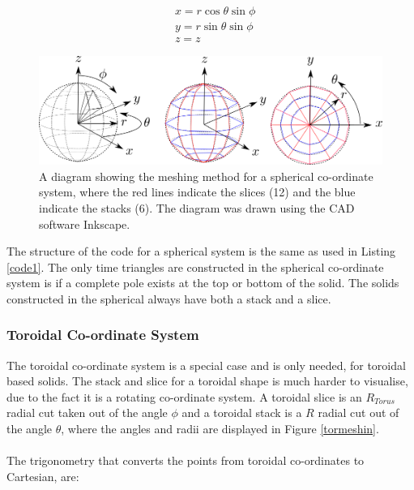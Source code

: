 \documentclass[12pt,a4paper]{article}
\begin{document}
\begin{equation}
\begin{aligned}
& x = r \cos{\theta}\sin{\phi}\\
& y = r \sin{\theta}\sin{\phi} \\
& z = z
\end{aligned}
\label{trigsph}
\end{equation}
\begin{figure}[h!]
\centering
\includegraphics[scale=0.5]{Images//Coords//sph.png}
\caption[width=\columnwidth]{A diagram showing the meshing method for a spherical co-ordinate system, where the red lines indicate the slices (12) and the blue indicate the stacks (6). The diagram was drawn using the CAD software Inkscape.}
\label{sphmeshin}
\end{figure}

\noindent The structure of the code for a spherical system is the same as used in Listing \ref{code1}. The only time triangles are constructed in the spherical co-ordinate system is if a complete pole exists at the top or bottom of the solid. The solids constructed in the spherical always have both a stack and a slice.

%

\subsubsection{Toroidal Co-ordinate System}

The toroidal co-ordinate system is a special case and is only needed, for toroidal based solids. The stack and slice for a toroidal shape is much harder to visualise, due to the fact it is a rotating co-ordinate system. A toroidal slice is an $R_{Torus}$ radial cut taken out of the angle $\phi$ and a toroidal stack is a $R$ radial cut out of the angle $\theta$, where the angles and radii are displayed in Figure \ref{tormeshin}. 
\\\\
The trigonometry that converts the points from toroidal co-ordinates to Cartesian, are:
\end{document}
